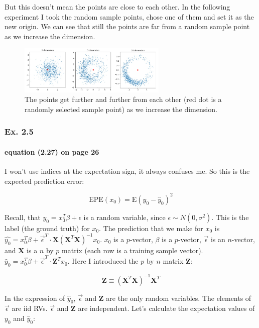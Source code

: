 \documentclass{article}
\begin{document}
But this doesn't mean the points are close to each other. In the following experiment I took the random sample points, chose one of them and set it as the new origin. We can see that still the points are far from a random sample point as we increase the dimension.

\begin{figure}[ht]
 \centering
  \includegraphics[width=200pt]{images/ex_2_2_sample.jpg}
 \caption{The points get further and further from each other (red dot is a randomly selected sample point) as we increase the dimension.}
\end{figure}

\subsubsection{Ex. 2.5}

\paragraph{equation (2.27) on page 26}

I won't use indices at the expectation sign, it always confuses me. So this is the expected prediction error:

\begin{equation}
    \text{EPE}(x_0) = \text{E}(y_0 - \hat{y}_0)^{2}
\end{equation}

Recall, that $y_0 = x_0^T \beta + \epsilon$ is a random variable, since $\epsilon \sim N(0,\sigma^2)$. This is the label (the ground truth) for $x_0$. The prediction that we make for $x_0$ is $\hat{y_0} = x_0^T \beta + \vec{\epsilon}^T \cdot \textbf{X} (\textbf{X}^T \textbf{X})^{-1} x_0$. $x_0$ is a $p$-vector, $\beta$ is a $p$-vector, $\vec{\epsilon}$ is an $n$-vector, and $\mathbf{X}$ is a $n$ by $p$ matrix (each row is a training sample vector). $\hat{y}_0 = x_0^T \beta + \vec{\epsilon}^T \cdot \textbf{Z}^T x_0$. Here I introduced the $p$ by $n$ matrix $\textbf{Z}$:

\begin{equation}
    \textbf{Z} \equiv (\textbf{X}^T \textbf{X})^{-1} \textbf{X}^T
\end{equation}

In the expression of $\hat{y}_0$, $\vec{\epsilon}$ and $\textbf{Z}$ are the only random variables. The elements of $\vec{\epsilon}$ are iid RVs. $\vec{\epsilon}$ and $\textbf{Z}$ are independent. Let's calculate the expectation values of $y_0$ and $\hat{y}_0$:
\end{document}
